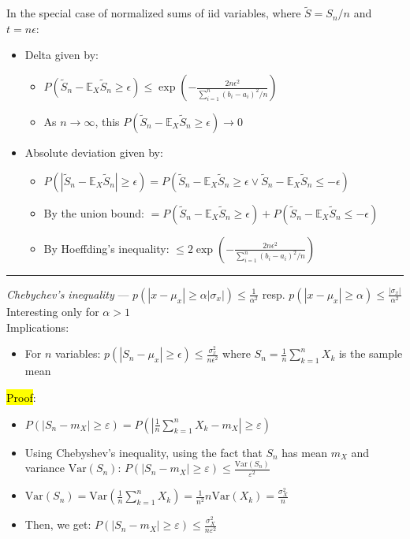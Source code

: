 In the special case of normalized sums of iid variables, where $\tilde{S} = S_n / n$ and $t = n\epsilon$:
\begin{itemize}
    \item Delta given by:
    \begin{itemize}
        \item $
        P(\tilde{S}_n - \mathbb{E}_X \tilde{S}_n \geq \epsilon) \leq \exp\left(-\frac{2n\epsilon^2}{\sum_{i=1}^n (b_i - a_i)^2 / n}\right)
        $
        \item As $n \to \infty$, this $P(\tilde{S}_n - \mathbb{E}_X \tilde{S}_n \geq \epsilon) \to 0$ 
    \end{itemize}
    \item Absolute deviation given by:
    \begin{itemize}
        \item $
        P(|\tilde{S}_n - \mathbb{E}_X \tilde{S}_n| \geq \epsilon) = P(\tilde{S}_n - \mathbb{E}_X \tilde{S}_n \geq \epsilon \lor \tilde{S}_n - \mathbb{E}_X \tilde{S}_n \leq -\epsilon)
        $
        \item By the union bound:
        $
        = P(\tilde{S}_n - \mathbb{E}_X \tilde{S}_n \geq \epsilon) + P(\tilde{S}_n - \mathbb{E}_X \tilde{S}_n \leq -\epsilon)
        $
        \item By Hoeffding's inequality:
        $
        \leq 2 \exp\left(-\frac{2n\epsilon^2}{\sum_{i=1}^n (b_i - a_i)^2 / n}\right)
        $
    \end{itemize}
\end{itemize}

{\color{lightgray}\hrule height 0.001mm}

\emph{Chebychev's inequality} --- $p( |x - \mu_x| \geq \alpha | \sigma_x |) \leq \frac{1}{\alpha^2}$ resp. $p( |x - \mu_x| \geq \alpha) \leq \frac{| \sigma_x |}{\alpha^2}$\\
Interesting only for $\alpha > 1$\\
Implications:
\begin{itemize}
    \item For $n$ variables: $p( |S_n - \mu_x| \geq \epsilon) \leq \frac{\sigma_x^2}{n \epsilon^2}$ where $S_n = \frac{1}{n} \sum_{k=1}^n X_k$ is the sample mean
\end{itemize}
\hl{Proof}:
\begin{itemize}
    \item $
    P(|S_n - m_X| \geq \varepsilon) = P\left(\left| \frac{1}{n} \sum_{k=1}^n X_k - m_X \right| \geq \varepsilon\right)
    $
    \item Using Chebyshev's inequality, using the fact that $S_n$ has mean $m_X$ and variance $\text{Var}(S_n)$:
    $
    P(|S_n - m_X| \geq \varepsilon) \leq \frac{\text{Var}(S_n)}{\varepsilon^2}
    $
    \item
    $
    \text{Var}(S_n) = \text{Var}\left(\frac{1}{n} \sum_{k=1}^n X_k\right) = \frac{1}{n^2} n \text{Var}(X_k) = \frac{\sigma_X^2}{n}
    $
    \item Then, we get:
    $
    P(|S_n - m_X| \geq \varepsilon) \leq \frac{\sigma_X^2}{n \varepsilon^2}
    $
\end{itemize}

